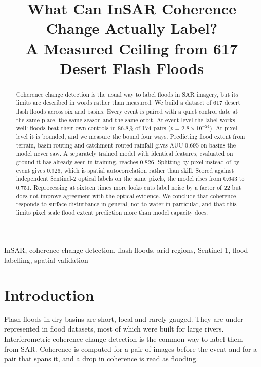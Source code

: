 \documentclass[10pt,conference]{IEEEtran}
\begin{document}
\title{What Can InSAR Coherence Change Actually Label?\\
A Measured Ceiling from 617 Desert Flash Floods}

\author{
}

\maketitle

\begin{abstract}
Coherence change detection is the usual way to label floods in SAR imagery, but
its limits are described in words rather than measured. We build a dataset of
617 desert flash floods across six arid basins. Every event is paired with a
quiet control date at the same place, the same season and the same orbit. At
event level the label works well: floods beat their own controls in 86.8\% of
174 pairs ($p = 2.8\times10^{-24}$). At pixel level it is bounded, and we
measure the bound four ways. Predicting flood extent from terrain, basin
routing and catchment routed rainfall gives AUC 0.695 on basins the model never
saw. A separately trained model with identical features, evaluated on ground it
has already seen in training, reaches 0.826. Splitting by pixel instead of by
event gives 0.926, which is spatial autocorrelation rather than skill. Scored against independent Sentinel-2 optical labels on the same pixels,
the model rises from 0.643 to 0.751. Reprocessing at sixteen times more looks
cuts label noise by a factor of 22 but does not improve agreement with the
optical evidence. We conclude that coherence responds to surface disturbance in
general, not to water in particular, and that this limits pixel scale flood
extent prediction more than model capacity does.
\end{abstract}

\begin{IEEEkeywords}
InSAR, coherence change detection, flash floods, arid regions, Sentinel-1,
flood labelling, spatial validation
\end{IEEEkeywords}

\section{Introduction}
Flash floods in dry basins are short, local and rarely gauged. They are
under-represented in flood datasets, most of which were built for large rivers.
Interferometric coherence change detection is the common way to label them from
SAR. Coherence is computed for a pair of images before the event and for a pair
that spans it, and a drop in coherence is read as flooding.
\end{document}
